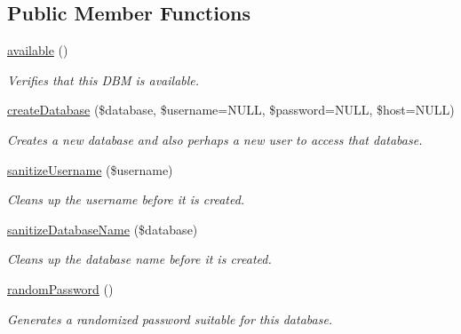 \subsection*{Public Member Functions}
\begin{DoxyCompactItemize}
\item 
\hyperlink{interfaceDatabaseManagerInterface_a1bdc962627a768e26d780cd0a26e2743}{available} ()
\begin{DoxyCompactList}\small\item\em Verifies that this D\-B\-M is available. \end{DoxyCompactList}\item 
\hyperlink{interfaceDatabaseManagerInterface_a6082d67a8a02ffd538c5193adfa8f605}{create\-Database} (\$database, \$username=N\-U\-L\-L, \$password=N\-U\-L\-L, \$host=N\-U\-L\-L)
\begin{DoxyCompactList}\small\item\em Creates a new database and also perhaps a new user to access that database. \end{DoxyCompactList}\item 
\hyperlink{interfaceDatabaseManagerInterface_a2b452f2d50f76f1f0f7fe6c8ff2f6da3}{sanitize\-Username} (\$username)
\begin{DoxyCompactList}\small\item\em Cleans up the username before it is created. \end{DoxyCompactList}\item 
\hyperlink{interfaceDatabaseManagerInterface_a15b880b5862fed9d6affae6bbcc1a402}{sanitize\-Database\-Name} (\$database)
\begin{DoxyCompactList}\small\item\em Cleans up the database name before it is created. \end{DoxyCompactList}\item 
\hyperlink{interfaceDatabaseManagerInterface_ae23eea67d89617c974b33f02bac77e33}{random\-Password} ()
\begin{DoxyCompactList}\small\item\em Generates a randomized password suitable for this database. \end{DoxyCompactList}\end{DoxyCompactItemize}


